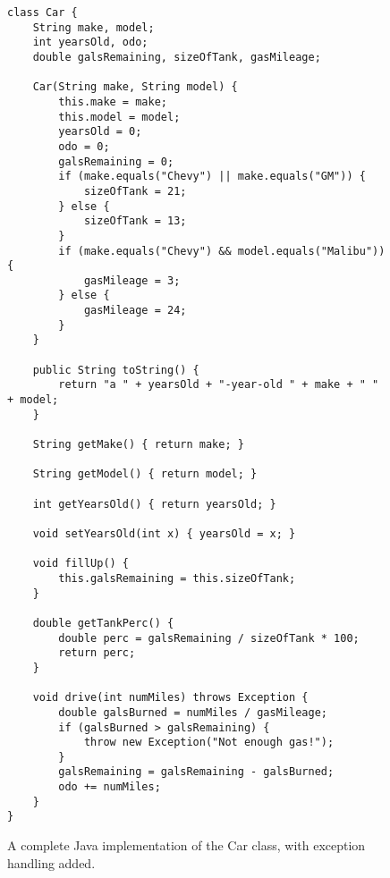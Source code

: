 


\begin{figure}
\begin{Verbatim}[fontsize=\scriptsize,frame=single]
class Car {
    String make, model;
    int yearsOld, odo;
    double galsRemaining, sizeOfTank, gasMileage;

    Car(String make, String model) {
        this.make = make;
        this.model = model;
        yearsOld = 0;
        odo = 0;
        galsRemaining = 0;
        if (make.equals("Chevy") || make.equals("GM")) {
            sizeOfTank = 21;
        } else {
            sizeOfTank = 13;
        }
        if (make.equals("Chevy") && model.equals("Malibu")) {
            gasMileage = 3;
        } else {
            gasMileage = 24;
        }
    }

    public String toString() {
        return "a " + yearsOld + "-year-old " + make + " " + model;
    }

    String getMake() { return make; }

    String getModel() { return model; }

    int getYearsOld() { return yearsOld; }

    void setYearsOld(int x) { yearsOld = x; }

    void fillUp() {
        this.galsRemaining = this.sizeOfTank;
    }

    double getTankPerc() {
        double perc = galsRemaining / sizeOfTank * 100;
        return perc;
    }

    void drive(int numMiles) throws Exception {
        double galsBurned = numMiles / gasMileage;
        if (galsBurned > galsRemaining) {
            throw new Exception("Not enough gas!");
        }
        galsRemaining = galsRemaining - galsBurned;
        odo += numMiles;
    }
}
\end{Verbatim}
\caption{A complete Java implementation of the Car class, with exception
handling added.}
\label{fig:carClassCode}
\end{figure}

